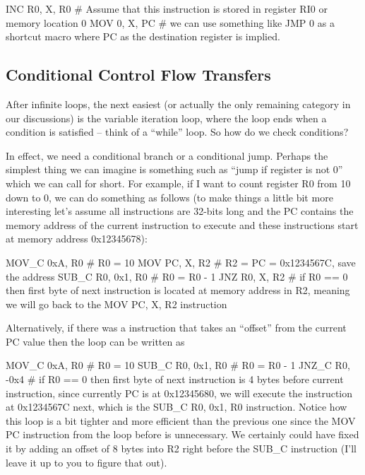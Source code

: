 \begin{code}
INC R0, X, R0 # Assume that this instruction is stored in register RI0 or memory location 0
MOV 0, X, PC # we can use something like JMP 0 as a shortcut macro where PC as the destination register is implied.
\end{code}

\subsection{Conditional Control Flow Transfers}

After infinite loops, the next easiest (or actually the only remaining category in our discussions) is the variable iteration loop, where the loop ends when a condition is satisfied -- think of a “while” loop. So how do we check conditions? 

In effect, we need a conditional branch or a conditional jump. Perhaps the simplest thing we can imagine is something such as “jump if register is not 0” which we can call  for short. For example, if I want to count register R0 from 10 down to 0, we can do something as follows (to make things a little bit more interesting let’s assume all instructions are 32-bits long and the PC contains the memory address of the current instruction to execute and these instructions start at memory address 0x12345678):

\begin{code}
MOV_C 0xA, R0 # R0 = 10
MOV PC, X, R2 # R2 = PC = 0x1234567C, save the address
SUB_C R0, 0x1, R0 # R0 = R0 - 1
JNZ R0, X, R2 # if R0 == 0 then first byte of next instruction is located at memory address in R2, meaning we will go back to the MOV PC, X, R2 instruction
\end{code}

Alternatively, if there was a  instruction that takes an “offset” from the current PC value then the loop can be written as

\begin{code}
MOV_C 0xA, R0 # R0 = 10
SUB_C R0, 0x1, R0 # R0 = R0 - 1
JNZ_C R0, -0x4 # if R0 == 0 then first byte of next instruction is 4 bytes before current instruction, since currently PC is at 0x12345680, we will execute the instruction at 0x1234567C next, which is the SUB\_C R0, 0x1, R0 instruction. Notice how this loop is a bit tighter and more efficient than the previous one since the MOV PC instruction from the loop before is unnecessary. We certainly could have fixed it by adding an offset of 8 bytes into R2 right before the SUB\_C instruction (I’ll leave it up to you to figure that out).
\end{code}

